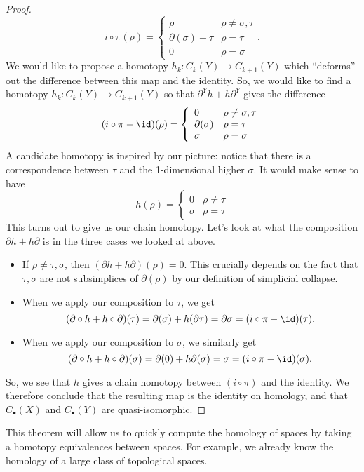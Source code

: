 \begin{proof}
\[i\circ \pi(\rho)=\left\{ \begin{array}{ll} \rho & \rho \neq \sigma, \tau\\ \partial(\sigma)-\tau & \rho = \tau \\
0 & \rho = \sigma \end{array} \right. .\]
We would like to propose a homotopy $h_k: C_k(Y)\to C_{k+1}(Y)$ which ``deforms'' out the difference between this map and the identity. So, we would like to find a homotopy $h_k:C_k(Y)\to C_{k+1}(Y)$ so that $\partial^Yh+h\partial^Y$ gives the difference 
\[(i\circ \pi-\id)(\rho)=\left\{ \begin{array}{ll} 0 & \rho \neq \sigma, \tau\\ \partial(\sigma) & \rho = \tau \\
\sigma & \rho = \sigma \end{array} \right. \]
A candidate homotopy is inspired by  our picture: notice that there is a correspondence between $\tau$ and the 1-dimensional higher $\sigma$. It would make sense to have 
\[h(\rho) = \left\{ \begin{array}{ll} 0 & \rho \neq \tau \\ \sigma & \rho = \tau \end{array}\right. 
\]
This turns out to give us our chain homotopy. Let's look at what the composition $\partial h + h \partial$ is in the three cases we looked at above. 
\begin{itemize}
\item If $\rho\neq \tau, \sigma$, then $(\partial h + h \partial)(\rho)=0.$ This crucially depends on the fact that $\tau, \sigma$ are not subsimplices of $\partial(\rho)$ by our definition of simplicial collapse. 
\item When we apply our composition to $\tau$, we get 
\[(\partial\circ h + h \circ \partial)(\tau) = \partial( \sigma)  + h (\partial \tau) = \partial\sigma= (i\circ \pi-\id)(\tau). \]
\item When we apply our composition to $\sigma$, we similarly get 
\[(\partial\circ h + h \circ \partial)(\sigma) = \partial(0)+ h \partial(\sigma) = \sigma = (i\circ \pi - \id)(\sigma). \]
\end{itemize}
So, we see that $h$ gives a chain homotopy between $(i\circ \pi)$ and the identity. We therefore conclude that the resulting map is the identity on homology, and that $C_\bullet(X)$ and $C_\bullet(Y)$ are quasi-isomorphic. 
\end{proof}
This theorem will allow us to quickly compute the homology of spaces by taking a homotopy equivalences between spaces. For example, we already know the homology of a large class of topological spaces.
